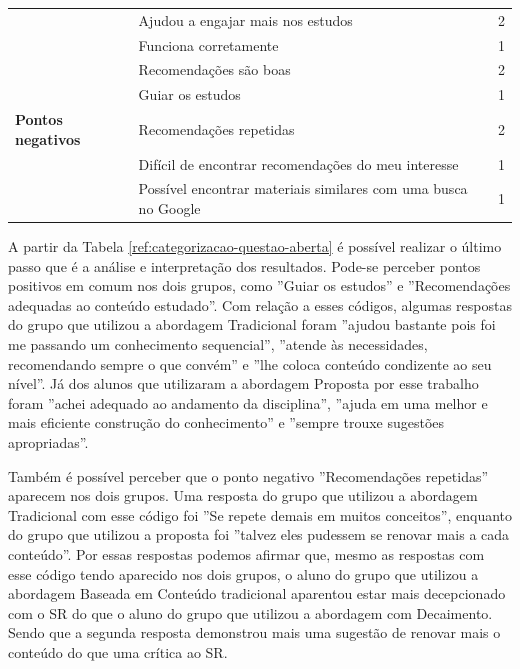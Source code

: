 \begin{table}[h]
\begin{tabular}{|p{3cm}|p{10cm}|p{2cm}|}
                          & Ajudou a engajar mais nos estudos                              & 2          \\
                          & Funciona corretamente                                          & 1          \\
                          & Recomendações são boas                                         & 2          \\
                          & Guiar os estudos                                               & 1          \\
\hline
\textbf{Pontos negativos} & Recomendações repetidas                                        & 2          \\
                          & Difícil de encontrar recomendações do meu interesse            & 1          \\
                          & Possível encontrar materiais similares com uma busca no Google & 1          \\
\hline
\end{tabular}
\end{table}

A partir da Tabela \ref{ref:categorizacao-questao-aberta} é possível realizar o último passo que é a análise e interpretação
dos resultados. Pode-se perceber pontos positivos em comum nos dois grupos, como ''Guiar os estudos'' e ''Recomendações adequadas ao conteúdo estudado''.
Com relação a esses códigos, algumas respostas do grupo que utilizou a abordagem Tradicional foram ''ajudou bastante pois foi me passando um conhecimento sequencial'',
''atende às necessidades, recomendando sempre o que convém'' e ''lhe coloca conteúdo condizente ao seu nível''.
Já dos alunos que utilizaram a abordagem Proposta por esse trabalho foram ''achei adequado ao andamento da disciplina'',
''ajuda em uma melhor e mais eficiente construção do conhecimento'' e ''sempre trouxe sugestões apropriadas''.

Também é possível perceber que o ponto negativo ''Recomendações repetidas'' aparecem nos dois grupos. Uma resposta do grupo
que utilizou a abordagem Tradicional com esse código foi ''Se repete demais em muitos conceitos'', enquanto do grupo que utilizou
a proposta foi ''talvez eles pudessem se renovar mais a cada conteúdo''. Por essas respostas podemos afirmar que, mesmo
as respostas com esse código tendo aparecido nos dois grupos, o aluno do grupo que utilizou a abordagem Baseada em Conteúdo
tradicional aparentou estar mais decepcionado com o SR do que o aluno do grupo que utilizou a abordagem com Decaimento.
Sendo que a segunda resposta demonstrou mais uma sugestão de renovar mais o conteúdo do que uma crítica ao SR.


